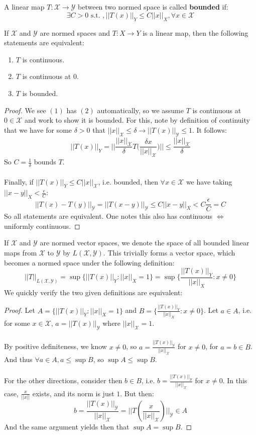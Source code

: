 \documentclass[12pt]{article}
\newcommand{\X}{\mathcal{X}}
\newcommand{\Y}{\mathcal{Y}}
\newcommand{\bignorm}{\Big | \Big |}
\newenvironment{theorem}[2][Theorem]{\begin{trivlist}
\item[\hskip \labelsep {\bfseries #1}\hskip \labelsep {\bfseries #2.}]}{\end{trivlist}}
\begin{document}
\\ \\
A linear map $T : \X \rightarrow \Y$ between two normed space is called \textbf{bounded} if:
$$\exists C > 0 \text{ s.t. }, ||T(x)||_{Y} \leq C||x||_X, \forall x \in \X$$
\begin{theorem}{(Continuity characterization)}
    If $\X$ and $\Y$ are normed spaces and $T : X \rightarrow Y$ is a linear map, then the following statements are equivalent:
    \begin{enumerate}
        \item $T$ is continuous.
        \item $T$ is continuous at $0$.
        \item $T$ is bounded. 
    \end{enumerate}
    \begin{proof}
        We see $(1)$ has $(2)$ automatically, so we assume $T$ is continuous at $0 \in \X$ and work to show it is bounded. For this, note by definition of continuity that we have for some $\delta > 0$ that $||x||_{\X} \leq \delta \rightarrow ||T(x)||_{\Y} \leq 1$. It follows:
        $$||T(x)||_Y = \bignorm \frac{||x||_{\X}}{\delta}T \Big ( \frac{\delta x}{||x||_{\X}} \Big )\bignorm \leq \frac{||x||_{\X}}{\delta}$$
        So $C = \frac{1}{\delta}$ bounds $T$. \\ \\
        Finally, if $||T(x)||_{Y} \leq C||x||_{\X}$, i.e. bounded, then $\forall x \in \X$ we have taking $||x - y||_{X} < \frac{\epsilon}{C}$:
        $$||T(x) - T(y)||_{\Y} = ||T(x-y)||_{\Y} \leq C||x-y||_{X} < C\frac{\epsilon}{C} = C$$
        So all statements are equivalent. One notes this also has continuous $\Leftrightarrow$ uniformly continuous.
    \end{proof}
\end{theorem}
If $\X$ and $\Y$ are normed vector spaces, we denote the space of all bounded linear maps from $\X$ to $\Y$ by $L(\X, \Y)$. This trivially forms a vector space, which becomes a normed space under the following definition:
$$||T||_{L(\X, \Y)} = \sup\{||T(x)||_Y : ||x||_{X} = 1\} = \sup\Big \{ \frac{||T(x)||_Y}{||x||_X} : x \neq 0 \Big \}$$
We quickly verify the two given definitions are equivalent:
\begin{proof}
    Let $A = \{||T(x)||_Y : ||x||_{X} = 1\}$ and $B = \Big \{ \frac{||T(x)||_Y}{||x||_X} : x \neq 0 \Big \}$. Let $a \in A$, i.e. for some $x \in \X$, $a = ||T(x)||_{\Y}$ where $||x||_{\X} = 1$. \\ \\
    By positive definiteness, we know $x \neq 0$, so $a = \frac{||T(x)||_{\Y}}{||x||_{\X}}$ for $x \neq 0$, for $a = b \in B$. And thus $\forall a \in A, a \leq \sup B$, so $\sup A \leq \sup B$. 
    \\ \\ For the other directions, consider then $b \in B$, i.e. $b = \frac{||T(x)||_{\mathcal{Y}}}{||x||_{\mathcal{X}}}$ for $x \neq 0$. In this case, $\frac{x}{||x||}$ exists, and its norm is just $1$. But then:
    $$b = \frac{||T(x)||_{\mathcal{Y}}}{||x||_{\mathcal{X}}} = \bignorm T(\frac{x}{||x||_{\X}}) \bignorm_{\Y} \in A$$
    And the same argument yields then that $\sup A = \sup B$. 
\end{proof}
\end{document}
